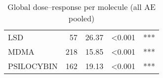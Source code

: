 \begin{table}[!h]
\centering
\caption{Global dose–response per molecule (all AE pooled)}
\centering
\begin{tabular}[t]{lrlll}
\toprule
LSD & 57 & 26.37 & <0.001 & ***\\
MDMA & 218 & 15.85 & <0.001 & ***\\
PSILOCYBIN & 162 & 19.13 & <0.001 & ***\\
\bottomrule
\end{tabular}
\end{table}

